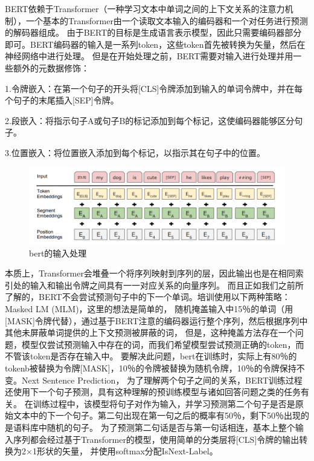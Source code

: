 BERT依赖于Transformer（一种学习文本中单词之间的上下文关系的注意力机制），一个基本的Transformer由一个读取文本输入的编码器和一个对任务进行预测的解码器组成。
由于BERT的目标是生成语言表示模型，因此只需要编码器部分即可。BERT编码器的输入是一系列token，这些token首先被转换为矢量，然后在神经网络中进行处理。
但是在开始处理之前，BERT需要对输入进行处理并用一些额外的元数据修饰：

1.令牌嵌入：在第一个句子的开头将[CLS]令牌添加到输入的单词令牌中，并在每个句子的末尾插入[SEP]令牌。

2.段嵌入：将指示句子A或句子B的标记添加到每个标记，这使编码器能够区分句子。

3.位置嵌入：将位置嵌入添加到每个标记，以指示其在句子中的位置。
\begin{figure}[htbp]
  \centering
  \includegraphics[scale=0.5]{./images/inputBert.jpg}
  \caption{bert的输入处理}
  \label{fig:inputBert}
\end{figure}

本质上，Transformer会堆叠一个将序列映射到序列的层，因此输出也是在相同索引处的输入和输出令牌之间具有一一对应关系的向量序列。
而且正如我们之前所了解的，BERT不会尝试预测句子中的下一个单词。培训使用以下两种策略：Masked LM (MLM)，这里的想法是简单的，
随机掩盖输入中15％的单词（用[MASK]令牌代替），通过基于BERT注意的编码器运行整个序列，然后根据序列中其他未屏蔽单词提供的上下文预测被屏蔽的词，
但是，这种掩盖方法存在一个问题，模型仅尝试预测输入中存在的词，而我们希望模型尝试预测正确的token，而不管该token是否存在输入中。
要解决此问题，bert在训练时，实际上有80％的tokenb被替换为令牌[MASK]，10％的令牌被替换为随机令牌，10％的令牌保持不变。Next Sentence Prediction，
为了理解两个句子之间的关系，BERT训练过程还使用下一个句子预测，具有这种理解的预训练模型与诸如回答问题之类的任务有关。
在训练过程中，该模型将句子对作为输入，并学习预测第二个句子是否是原始文本中的下一个句子。第二句出现在第一句之后的概率有50％，剩下50％出现的是语料库中随机的句子。
为了预测第二句话是否与第一句话相连，基本上整个输入序列都会经过基于Transformer的模型，使用简单的分类层将[CLS]令牌的输出转换为2×1形状的矢量，
并使用softmax分配IsNext-Label。